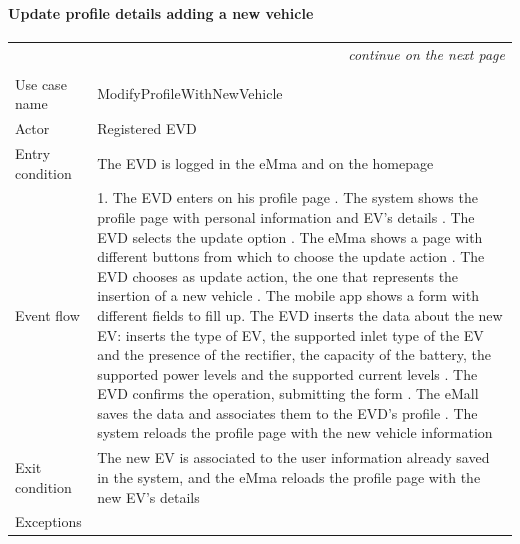 \paragraph{Update profile details adding a new vehicle}
\begin{center}
    \begin{longtable}{p{4cm} p{11cm}}
    \multicolumn{2}{r}{\itshape{continue on the next page}}\\
    \endfoot 
    \\
    \endlastfoot
    \hline
     Use case name &  ModifyProfileWithNewVehicle\\
     \hline
     Actor & Registered EVD \\
     \hline
     Entry condition & The EVD is logged in the eMma and on the homepage \\
     \hline
     Event flow &   1. The EVD enters on his profile page \newline
                    2. The system shows the profile page with personal information and EV's details \newline
                    3. The EVD selects the update option \newline
                    4. The eMma shows a page with different buttons from which to choose the update action \newline
                    5. The EVD chooses as update action, the one that represents the insertion of a new vehicle \newline
                    6. The mobile app shows a form with different fields to fill up\newline
                    7. The EVD inserts the data about the new EV: inserts the type of EV, the supported inlet type of the EV and the presence of the rectifier, the capacity of the battery, the supported power levels and the supported current levels \newline
                    8. The EVD confirms the operation, submitting the form \newline
                    9. The eMall saves the data and associates them to the EVD's profile \newline
                    10. The system reloads the profile page with the new vehicle information \\
     \hline
     Exit condition &  The new EV is associated to the user information already saved in the system, and the eMma reloads the profile page with the new EV's details\\
     \hline
     Exceptions &   

\end{longtable}
\end{center}
